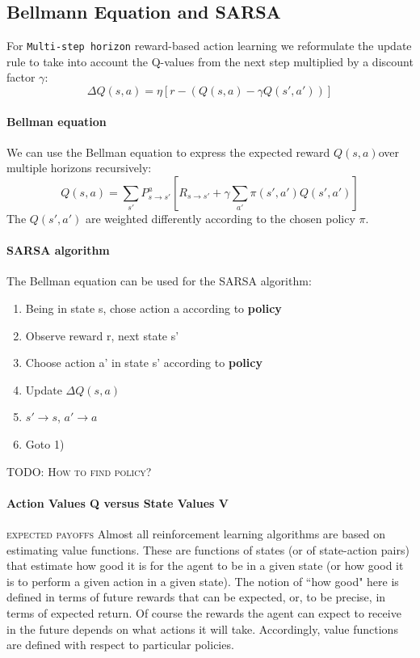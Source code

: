 \documentclass[11pt]{article}
\begin{document}
\subsection{Bellmann Equation and SARSA}
For \texttt{Multi-step horizon} reward-based action learning we reformulate the update rule to take into account the Q-values from the next step multiplied by a discount factor $\gamma$:
\[
	\Delta Q(s,a) = \eta \left[r-(Q(s,a) - \gamma Q(s', a'))\right]
\]
\paragraph{Bellman equation}
We can use the Bellman equation to express the expected reward $Q(s,a)$over multiple horizons recursively: 
\[
	Q(s,a) = \sum_{s'}P_{s \rightarrow s'}^a [R_{s \rightarrow s'} + \gamma \sum_{a'} \pi(s',a')Q(s',a')]
\]
The $Q(s',a')$ are weighted differently according to the chosen policy $\pi$.

\paragraph{SARSA algorithm}
The Bellman equation can be used for the SARSA algorithm:
\begin{enumerate}
	\item Being in state s, chose action a according to \textbf{policy}
	\item Observe reward r, next state s'
	\item Choose action a' in state s' according to \textbf{policy}
	\item Update $\Delta Q(s,a)$
	\item $s' \rightarrow s$, $a' \rightarrow a$
	\item Goto 1)
\end{enumerate}
\textsc{TODO: How to find policy?}

\paragraph{Action Values Q versus State Values V}
\textsc{expected payoffs}
Almost all reinforcement learning algorithms are based on estimating value functions. These are functions of states (or of state-action pairs) that estimate how good it is for the agent to be in a given state (or
how good it is to perform a given action in a given state). The notion of ``how good" here is defined in terms of future rewards that can be expected, or, to be precise, in terms of expected return. Of course the rewards the agent can expect to receive in the future depends on what actions it will take. Accordingly, value functions are defined with respect to particular policies.\\
\end{document}

